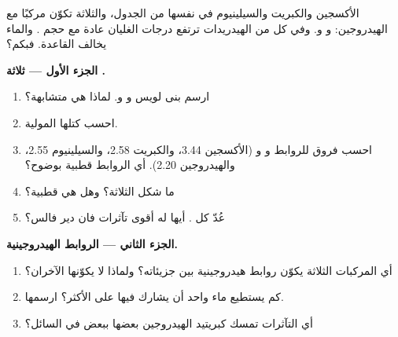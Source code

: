 \begin{problem}
\label{pb:g11:polarity-and-cohesion:1}
الأكسجين والكبريت والسيلينيوم في  نفسها من الجدول، والثلاثة تكوّن مركبًا مع
الهيدروجين:  و و. وفي كل  من الهيدريدات ترتفع
درجات الغليان عادة مع حجم . والماء يخالف القاعدة. فبكم؟

\medskip
\noindent\textbf{الجزء الأول --- ثلاثة .}
\begin{enumerate}
  \item ارسم بنى لويس   و و.
        لماذا هي متشابهة؟
  \item احسب كتلها المولية.
  \item احسب فروق  للروابط
         و و (الأكسجين 3.44، والكبريت 2.58،
        والسيلينيوم 2.55، والهيدروجين 2.20). أي الروابط قطبية بوضوح؟
  \item ما شكل  الثلاثة؟ وهل هي قطبية؟
  \item عُدّ  كل . أيها له أقوى تآثرات فان
        دير فالس؟
\end{enumerate}

\medskip
\noindent\textbf{الجزء الثاني --- الروابط الهيدروجينية.}
\begin{enumerate}[resume]
  \item أي المركبات الثلاثة يكوّن روابط هيدروجينية بين
        جزيئاته؟ ولماذا لا يكوّنها الآخران؟
  \item كم  يستطيع  ماء واحد أن يشارك فيها على
        الأكثر؟ ارسمها.
  \item أي التآثرات تمسك  كبريتيد الهيدروجين بعضها ببعض
        في السائل؟
\end{enumerate}


\end{problem}
